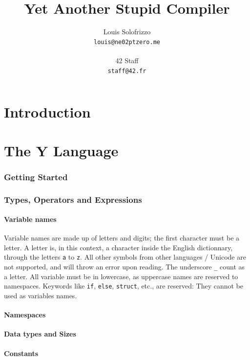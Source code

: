 \documentclass{scrartcl}
\title{Yet Another Stupid Compiler}
\author{
    Louis Solofrizzo\\
    \texttt{louis@ne02ptzero.me}\\
    \\
    42 Staff\\
    \texttt{staff@42.fr}
}
\begin{document}
\begin{titlingpage}
    \maketitle
\end{titlingpage}


    \tableofcontents{}
    \newpage

\part{Introduction}
\part{The Y Language}
    \section{Getting Started}
    \section{Types, Operators and Expressions}
        \subsection{Variable names}
            Variable names are made up of letters and digits; the first character
            must be a letter. A letter is, in this context, a character inside
            the English dictionnary, through the letters \texttt{a} to \texttt{z}.
            All other symbols from other languages / Unicode are not supported,
            and will throw an error upon reading. The underscore \texttt{\_}
            count as a letter. All variable must be in lowercase, as uppercase
            names are reserved to namespaces.
            Keywords like \texttt{if}, \texttt{else}, \texttt{struct}, etc., are
            reserved: They cannot be used as variables names.
        \subsection{Namespaces}
        \subsection{Data types and Sizes}
        \subsection{Constants}
\end{document}
